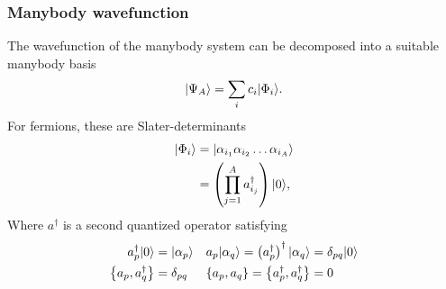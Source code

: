 \begin{frame}[fragile]
    \frametitle{Manybody wavefunction}

    The wavefunction of the manybody system can be decomposed into a suitable manybody basis
    \begin{equation*}
        |\Psi_A\rangle = \sum_{i} c_i |\Phi_i\rangle.
    \end{equation*} 
    For fermions, these are Slater-determinants
    \begin{align*}
        |\Phi_i\rangle &= | \alpha_{i_1} \alpha_{i_2} \ldots \alpha_{i_A}\rangle \\
        &= \left(\prod_{j=1}^A a^\dagger_{{i_j}} \right)|0\rangle,
    \end{align*}
    Where $a^\dagger$ is a second quantized operator satisfying
    \begin{align*}
        a_p^\dagger|0\rangle &= |\alpha_p\rangle 
        & a_p |\alpha_q\rangle = \left(a_p^\dagger \right)^\dagger|\alpha_q\rangle &= \delta_{pq}|0\rangle \\
        \left\{a_p, a_q^\dagger \right\} &= \delta_{pq}
            & \left\{a_p, a_q \right\} = \left\{a_p^\dagger, a_q^\dagger \right\} &= 0
    \end{align*}
\end{frame}
